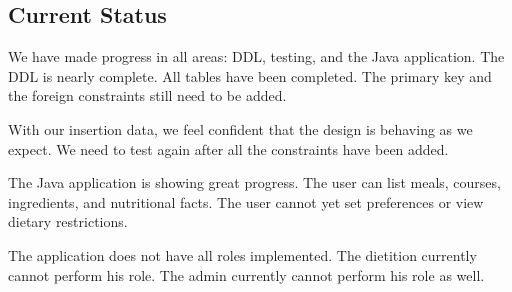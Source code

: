 \documentclass[a4paper,10pt,toc=graduated]{article}
\begin{document}
\subsection{Current Status}
We have made progress in all areas: DDL, testing, and the Java application.
The DDL is nearly complete.
All tables have been completed.
The primary key and the foreign constraints still need to be added.
\newline

With our insertion data,
we feel confident that the design is behaving as we expect.
We need to test again after all the constraints have been added.
\newline

The Java application is showing great progress.
The user can list meals, courses, ingredients, and nutritional facts.
The user cannot yet set preferences or view dietary restrictions.
\newline

The application does not have all roles implemented.
The dietition currently cannot perform his role.
The admin currently cannot perform his role as well.
\end{document}

